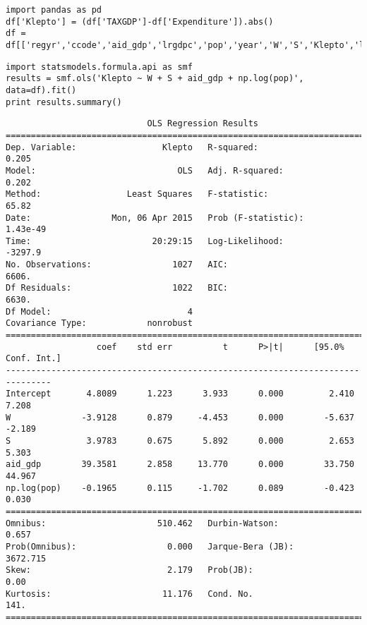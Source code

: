 \documentclass[12pt,fleqn]{article}\usepackage{common}
\begin{document}
\begin{verbatim}
import pandas as pd
df['Klepto'] = (df['TAXGDP']-df['Expenditure']).abs()
df = df[['regyr','ccode','aid_gdp','lrgdpc','pop','year','W','S','Klepto','laglrgdpc']]
\end{verbatim}

\begin{verbatim}
import statsmodels.formula.api as smf
results = smf.ols('Klepto ~ W + S + aid_gdp + np.log(pop)', data=df).fit()
print results.summary()
\end{verbatim}

\begin{verbatim}
                            OLS Regression Results                            
==============================================================================
Dep. Variable:                 Klepto   R-squared:                       0.205
Model:                            OLS   Adj. R-squared:                  0.202
Method:                 Least Squares   F-statistic:                     65.82
Date:                Mon, 06 Apr 2015   Prob (F-statistic):           1.43e-49
Time:                        20:29:15   Log-Likelihood:                -3297.9
No. Observations:                1027   AIC:                             6606.
Df Residuals:                    1022   BIC:                             6630.
Df Model:                           4                                         
Covariance Type:            nonrobust                                         
===============================================================================
                  coef    std err          t      P>|t|      [95.0% Conf. Int.]
-------------------------------------------------------------------------------
Intercept       4.8089      1.223      3.933      0.000         2.410     7.208
W              -3.9128      0.879     -4.453      0.000        -5.637    -2.189
S               3.9783      0.675      5.892      0.000         2.653     5.303
aid_gdp        39.3581      2.858     13.770      0.000        33.750    44.967
np.log(pop)    -0.1965      0.115     -1.702      0.089        -0.423     0.030
==============================================================================
Omnibus:                      510.462   Durbin-Watson:                   0.657
Prob(Omnibus):                  0.000   Jarque-Bera (JB):             3672.715
Skew:                           2.179   Prob(JB):                         0.00
Kurtosis:                      11.176   Cond. No.                         141.
==============================================================================

\end{verbatim}
\end{document}
